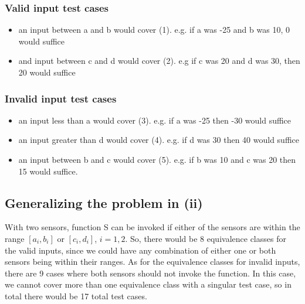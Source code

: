 \documentclass[letterpaper]{article}
\begin{document}
\subsubsection*{Valid input test cases}
\begin{itemize}
	\item an input between a and b would cover (1). e.g. if a was -25 and b
		was 10, 0 would suffice
	\item and input between c and d would cover (2). e.g if c was 20 and d
		was 30, then 20 would suffice
\end{itemize}

\subsubsection*{Invalid input test cases}
\begin{itemize}
	\item an input less than a would cover (3). e.g. if a was -25 then -30
		would suffice
	\item an input greater than d would cover (4). e.g. if d was 30 then 40
		would suffice
	\item an input between b and c would cover (5). e.g. if b was 10 and c
		was 20 then 15 would suffice.
\end{itemize}

\subsection{Generalizing the problem in (ii)}
With two sensors, function S can be invoked if either of the sensors are within
the range $[a_i, b_i]$ or $[c_i, d_i]$, $i=1,2$. So, there would be 8
equivalence classes for the valid inputs, since we could have any combination
of either one or both sensors being within their ranges. As for the
equivalence classes for invalid inputs, there are 9 cases where both sensors
should not invoke the function. In this case, we cannot cover more than one
equivalence class with a singular test case, so in total there would be 17
total test cases.


\end{document}
